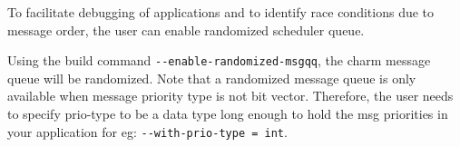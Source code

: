 To facilitate debugging of applications and to identify race conditions due to
message order, the user can enable randomized scheduler queue. 

Using the build command \verb|--enable-randomized-msgqq|, the charm message queue
will be randomized. Note that a randomized message queue is only available when
message priority type is not bit vector.  Therefore, the user needs to specify
prio-type to be a data type long enough to hold the msg priorities in your
application for eg: \verb|--with-prio-type = int|.
